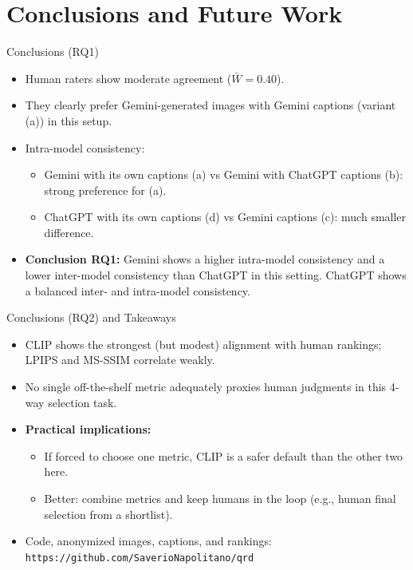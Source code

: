 \documentclass[aspectratio=169]{beamer}
\begin{document}
\section{Conclusions and Future Work}

\begin{frame}{Conclusions (RQ1)}
  \begin{itemize}
    \item Human raters show moderate agreement (\( \bar{W} = 0.40 \)).
    \item They clearly prefer Gemini-generated images with Gemini captions
          (variant (a)) in this setup.
    \item Intra-model consistency:
      \begin{itemize}
        \item Gemini with its own captions (a) vs Gemini with ChatGPT
              captions (b): strong preference for (a).
        \item ChatGPT with its own captions (d) vs Gemini captions (c):
              much smaller difference.
      \end{itemize}
    \item \textbf{Conclusion RQ1:} Gemini shows a higher intra-model consistency and a lower inter-model consistency than ChatGPT in this setting. ChatGPT shows a balanced inter- and intra-model consistency.
  \end{itemize}
\end{frame}

\begin{frame}{Conclusions (RQ2) and Takeaways}
  \begin{itemize}
    \item CLIP shows the strongest (but modest) alignment with human
          rankings; LPIPS and MS-SSIM correlate weakly.
    \item No single off-the-shelf metric adequately proxies human
          judgments in this 4-way selection task.
    \item \textbf{Practical implications:}
      \begin{itemize}
        \item If forced to choose one metric, CLIP is a safer default
              than the other two here.
        \item Better: combine metrics and keep humans in the loop
              (e.g., human final selection from a shortlist).
      \end{itemize}
    \item Code, anonymized images, captions, and rankings:
          \texttt{https://github.com/SaverioNapolitano/qrd}
  \end{itemize}
\end{frame}
\end{document}
